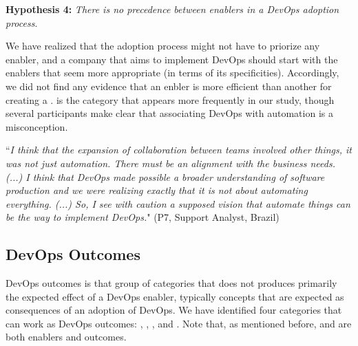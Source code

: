\begin{mh}
{\begin{mh}
\textbf{Hypothesis 4:} \textit{There is no precedence between enablers in a DevOps adoption process}.
\end{mh}

We have realized that the adoption process might not have
to priorize any enabler, and a company that aims to implement
DevOps should start with  the enablers that seem more appropriate (in terms
of its specificities). Accordingly, we did not find any evidence that an enbler
is more efficient than another for creating a \cc.  is the category
that appears more frequently in our study, though several participants make
clear that associating DevOps with automation is a misconception.

\begin{mq}
``\emph{I think that the expansion of collaboration between teams involved other
things, it was not just automation. There must be an alignment with the
business needs. (...) I think that DevOps made possible a broader understanding
of software production and we were realizing exactly that it is not about
automating everything. (...) So, I see with caution a supposed vision that automate things can
be the way to implement DevOps.}" (P7, Support Analyst, Brazil)
\end{mq}



\subsection{DevOps Outcomes}

DevOps outcomes is that group of categories that does not produces primarily the
expected effect of a DevOps enabler, typically concepts that are expected as
consequences of an adoption of DevOps. We have identified four categories that
can work as DevOps outcomes: , ,
, and . Note that,
as mentioned before,  and 
are both enablers and outcomes.

}
\end{mh}
